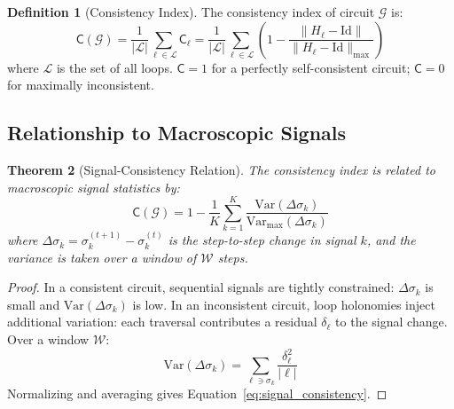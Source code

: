 \documentclass[10pt,twocolumn,a4paper]{article}
\theoremstyle{plain}
\newtheorem{theorem}{Theorem}[section]
\theoremstyle{definition}
\newtheorem{definition}[theorem]{Definition}
\theoremstyle{remark}
\newcommand{\circuit}{\mathcal{G}}
\newcommand{\consist}{\mathsf{C}}
\newcommand{\sig}{\sigma}
\newcommand{\window}{\mathcal{W}}
\begin{document}
\begin{definition}[Consistency Index]
\label{def:consistency_index}
The consistency index of circuit $\circuit$ is:
\begin{equation}
    \consist(\circuit) = \frac{1}{|\mathcal{L}|} \sum_{\ell \in \mathcal{L}} \consist_\ell = \frac{1}{|\mathcal{L}|} \sum_{\ell \in \mathcal{L}} \left(1 - \frac{\|H_\ell - \mathrm{Id}\|}{\|H_\ell - \mathrm{Id}\|_{\max}}\right)
    \label{eq:consistency_index}
\end{equation}
where $\mathcal{L}$ is the set of all loops. $\consist = 1$ for a perfectly self-consistent circuit; $\consist = 0$ for maximally inconsistent.
\end{definition}

\subsection{Relationship to Macroscopic Signals}

\begin{theorem}[Signal-Consistency Relation]
\label{thm:signal_consistency}
The consistency index is related to macroscopic signal statistics by:
\begin{equation}
    \consist(\circuit) = 1 - \frac{1}{K} \sum_{k=1}^{K} \frac{\mathrm{Var}(\Delta\sig_k)}{\mathrm{Var}_{\max}(\Delta\sig_k)}
    \label{eq:signal_consistency}
\end{equation}
where $\Delta\sig_k = \sig_k^{(t+1)} - \sig_k^{(t)}$ is the step-to-step change in signal $k$, and the variance is taken over a window of $\window$ steps.
\end{theorem}

\begin{proof}
In a consistent circuit, sequential signals are tightly constrained: $\Delta\sig_k$ is small and $\mathrm{Var}(\Delta\sig_k)$ is low. In an inconsistent circuit, loop holonomies inject additional variation: each traversal contributes a residual $\delta_\ell$ to the signal change. Over a window $\window$:
\begin{equation}
    \mathrm{Var}(\Delta\sig_k) = \sum_{\ell \ni \sig_k} \frac{\delta_\ell^2}{|\ell|}
\end{equation}
Normalizing and averaging gives Equation~\ref{eq:signal_consistency}.
\end{proof}
\end{document}

